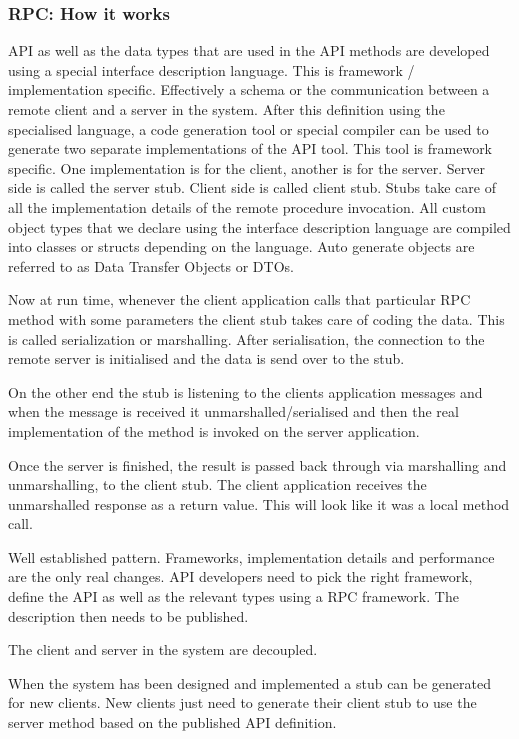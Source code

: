 \subsubsection{RPC: How it works}
API as well as the data types that are used in the API methods are developed using a special interface description language.
This is framework / implementation specific.
Effectively a schema or the communication between a remote client and a server in the system.
After this definition using the specialised language, a code generation tool or special compiler can be used to generate two separate implementations of the API tool.
This tool is framework specific.
One implementation is for the client, another is for the server.
Server side is called the server stub.
Client side is called client stub.
Stubs take care of all the implementation details of the remote procedure invocation.
All custom object types that we declare using the interface description language are compiled into classes or structs depending on the language.
Auto generate objects are referred to as Data Transfer Objects or DTOs.

Now at run time, whenever the client application calls that particular RPC method with some parameters the client stub takes care of coding the data.
This is called serialization or marshalling.
After serialisation, the connection to the remote server is initialised and the data is send over to the stub.

On the other end the stub is listening to the clients application messages and when the message is received it
unmarshalled/serialised and then the real implementation of the method is invoked on the server application.

Once the server is finished, the result is passed back through via marshalling and unmarshalling, to the client stub.
The client application receives the unmarshalled response as a return value.
This will look like it was a local method call.

Well established pattern.
Frameworks, implementation details and performance are the only real changes.
API developers need to pick the right framework, define the API as well as the relevant types using a RPC framework.
The description then needs to be published.

The client and server in the system are decoupled.

When the system has been designed and implemented a stub can be generated for new clients.
New clients just need to generate their client stub to use the server method based on the published API definition.

